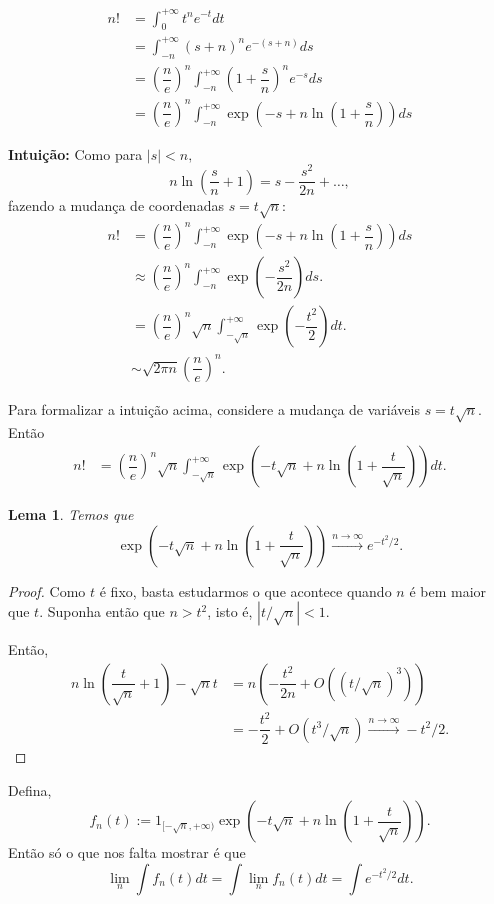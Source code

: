 \documentclass[12pt,a4paper,oneside]{book}
\newtheorem{lemma}[theorem]{Lema}
\theoremstyle{definition}
\theoremstyle{remark}
\numberwithin{equation}{section}
\newcommand{\rarrowlimn}{\xrightarrow{n\rightarrow \infty}}
\begin{document}
\begin{align*}
n! &= \int_0^{+\infty} t^n e^{-t}dt \\
 &=\int_{-n}^{+\infty} (s+n)^n e^{-(s+n)}ds \\
 &=\left(\dfrac{n}{e}\right)^n\int_{-n}^{+\infty} \left(1+\dfrac{s}{n}\right)^n e^{-s}ds\\
 &=\left(\dfrac{n}{e}\right)^n\int_{-n}^{+\infty}  \exp\left(-s+n\ln\left(1+\dfrac{s}{n}\right)\right) ds 
\end{align*}
\begin{tcolorbox}[colback = yellow!60] \textbf{Intuição: }
Como para $|s|<n,$
$$n\ln\left(\dfrac{s}{n}+1\right) = s -\dfrac{s^2}{2n}+\dots, $$
fazendo  a mudança de coordenadas $s = t\sqrt{n}$:
\begin{align*}
n! &=  \left(\dfrac{n}{e}\right)^n\int_{-n}^{+\infty}  \exp\left(-s+n\ln\left(1+\dfrac{s}{n}\right)\right) ds \\
&\approx\left(\dfrac{n}{e}\right)^n\int_{-n}^{+\infty}  \exp\left(-\dfrac{s^2}{2n}\right) ds.\\
& = \left(\dfrac{n}{e}\right)^n \sqrt{n}\int_{-\sqrt{n}}^{+\infty}  \exp\left(-\dfrac{t^2}{2}\right) dt.\\
& \sim \sqrt{2\pi n} \left(\dfrac{n}{e}\right)^n .
\end{align*}
\end{tcolorbox}
Para formalizar a intuição acima, considere a mudança de variáveis $s=t\sqrt{n}$. Então
\begin{align*}
n! &=\left(\dfrac{n}{e}\right)^n\sqrt{n}\int_{-\sqrt{n}}^{+\infty}  \exp\left(-t\sqrt{n}+n\ln\left(1+\dfrac{t}{\sqrt{n}}\right)\right) dt .
\end{align*}
\begin{lemma}
 Temos que
$$\exp\left(-t\sqrt{n}+n\ln\left(1+\dfrac{t}{\sqrt{n}}\right)\right) \rarrowlimn e^{-t^2/2}. $$
\end{lemma}
\begin{proof}
Como $t$ é fixo, basta estudarmos o que acontece quando $n$ é bem maior que $t$. Suponha então que $n>t^2$, isto é, $|t/\sqrt{n}|<1$.

Então,
\begin{align*}
n\ln\left(\dfrac{t}{\sqrt{n}}+1\right) - \sqrt{n}t &= n\left(-\dfrac{t^2}{2n}+O((t/\sqrt{n})^3)\right)\\
&=-\dfrac{t^2}{2}+O(t^3/\sqrt{n})\rarrowlimn -t^2/2.
\end{align*}
\end{proof}
Defina,
$$f_n(t) := 1_{[-\sqrt{n}, +\infty )}\exp\left(-t\sqrt{n}+n\ln\left(1+\dfrac{t}{\sqrt{n}}\right)\right). $$
Então só o que nos falta mostrar é que
$$\lim_n \int f_n(t)dt = \int \lim_n f_n(t)dt = \int e^{-t^2/2}dt. $$
\end{document}
